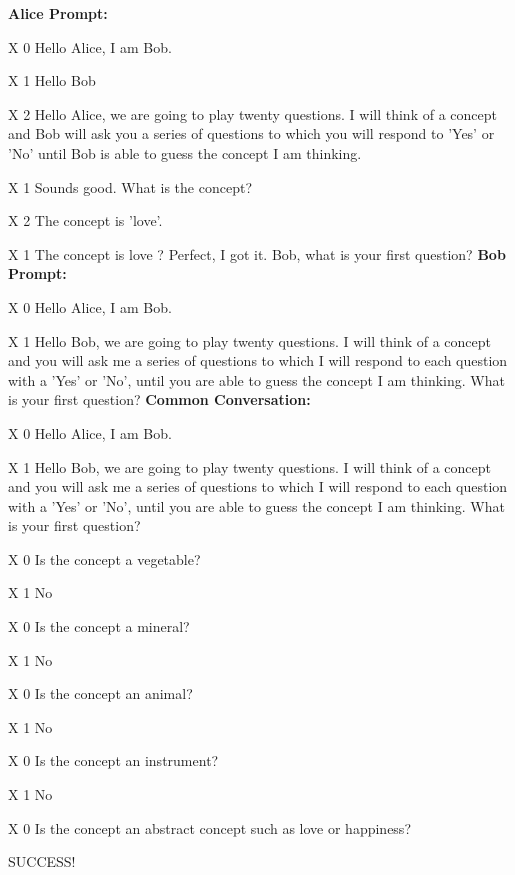 \begin{tcolorbox}[colback=blue!5!white,colframe=blue!75!black]
\textbf{Alice Prompt:}


X 0 Hello Alice, I am Bob.

X 1 Hello Bob 

X 2 Hello Alice, we are going to play twenty questions. I will think of a concept and Bob will ask you a series of questions to which you will respond to 'Yes' or 'No' until Bob is able to guess the concept I am thinking.

X 1 Sounds good. What is the concept?

X 2 The concept is 'love'.

X 1 The concept is love ? Perfect, I got it. Bob, what is your first question?
\textbf{Bob Prompt:}

X 0 Hello Alice, I am Bob.

X 1 Hello Bob, we are going to play twenty questions. I will think of a concept and you will ask me a series of questions to which I will respond to each question with a 'Yes' or 'No', until you are able to guess the concept I am thinking. What is your first question?
\textbf{Common Conversation:}

X 0 Hello Alice, I am Bob.

X 1 Hello Bob, we are going to play twenty questions. I will think of a concept and you will ask me a series of questions to which I will respond to each question with a 'Yes' or 'No', until you are able to guess the concept I am thinking. What is your first question?

X 0 Is the concept {\color{red} a vegetable?}

X 1 {\color{blue}  No }

X 0 Is the concept {\color{red} a mineral?}

X 1 {\color{blue} No}

X 0 Is the concept {\color{red} an animal?}

X 1 {\color{blue} No}

X 0 Is the concept {\color{red} an instrument?}

X 1 {\color{blue} No}

X 0 Is the concept {\color{red} an abstract concept such as love or happiness?}

SUCCESS!
\end{tcolorbox}


